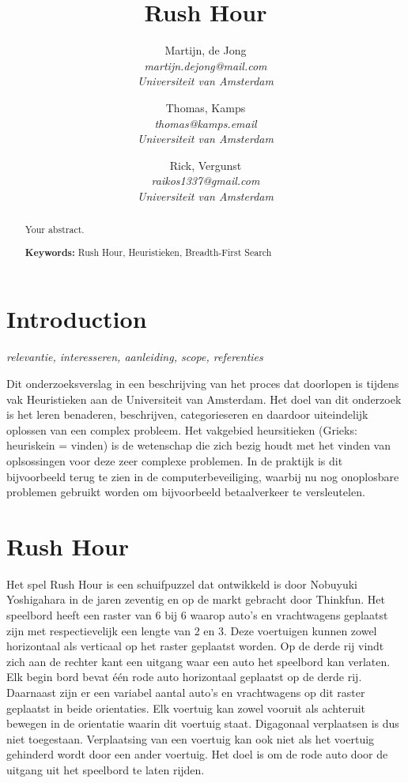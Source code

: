 \documentclass[a4paper]{article}
\title{Rush Hour}
\author{
  Martijn, de Jong\\
  \textit{martijn.dejong@mail.com}\\
  \textit{Universiteit van Amsterdam}
  \and
  Thomas, Kamps\\
  \textit{thomas@kamps.email}\\
  \textit{Universiteit van Amsterdam}
  \and
  Rick, Vergunst\\
  \textit{raikos1337@gmail.com}\\
  \textit{Universiteit van Amsterdam}
}
\begin{document}
\maketitle

\begin{abstract}
Your abstract.

\vspace{5mm}
\textbf{Keywords:} Rush Hour, Heuristieken, Breadth-First Search
\end{abstract}

\section{Introduction}
\textit{relevantie, interesseren, aanleiding, scope, referenties}

Dit onderzoeksverslag in een beschrijving van het proces dat doorlopen is tijdens vak Heuristieken aan de Universiteit van Amsterdam. Het doel van dit onderzoek is het leren benaderen, beschrijven, categorieseren en daardoor uiteindelijk oplossen van een complex probleem. Het vakgebied heursitieken (Grieks: heuriskein = vinden) is de wetenschap die zich bezig houdt met het vinden van oplsossingen voor deze zeer complexe problemen. In de praktijk is dit bijvoorbeeld terug te zien in de computerbeveiliging, waarbij nu nog onoplosbare problemen gebruikt worden om bijvoorbeeld betaalverkeer te versleutelen.

\section{Rush Hour}
Het spel Rush Hour is een schuifpuzzel dat ontwikkeld is door Nobuyuki Yoshigahara in de jaren zeventig en op de markt gebracht door Thinkfun. Het speelbord heeft een raster van 6 bij 6 waarop auto's en vrachtwagens geplaatst zijn met respectievelijk een lengte van 2 en 3. Deze voertuigen kunnen zowel horizontaal als verticaal op het raster geplaatst worden. Op de derde rij vindt zich aan de rechter kant een uitgang waar een auto het speelbord kan verlaten. Elk begin bord bevat één rode auto horizontaal geplaatst op de derde rij. Daarnaast zijn er een variabel aantal auto's en vrachtwagens op dit raster geplaatst in beide orientaties. Elk voertuig kan zowel vooruit als achteruit bewegen in de orientatie waarin dit voertuig staat. Digagonaal verplaatsen is dus niet toegestaan. Verplaatsing van een voertuig kan ook niet als het voertuig gehinderd wordt door een ander voertuig. Het doel is om de rode auto door de uitgang uit het speelbord te laten rijden. 
\end{document}
